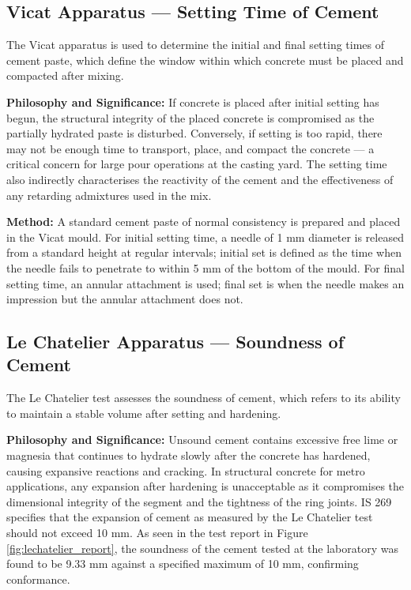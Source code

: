\subsection{Vicat Apparatus --- Setting Time of Cement}
\par\noindent
The Vicat apparatus is used to determine the initial and final setting times of cement paste, which define the window within which concrete must be placed and compacted after mixing.

\par\noindent
\textbf{Philosophy and Significance:} If concrete is placed after initial setting has begun, the structural integrity of the placed concrete is compromised as the partially hydrated paste is disturbed. Conversely, if setting is too rapid, there may not be enough time to transport, place, and compact the concrete --- a critical concern for large pour operations at the casting yard. The setting time also indirectly characterises the reactivity of the cement and the effectiveness of any retarding admixtures used in the mix.

\par\noindent
\textbf{Method:} A standard cement paste of normal consistency is prepared and placed in the Vicat mould. For initial setting time, a needle of 1 mm diameter is released from a standard height at regular intervals; initial set is defined as the time when the needle fails to penetrate to within 5 mm of the bottom of the mould. For final setting time, an annular attachment is used; final set is when the needle makes an impression but the annular attachment does not.

\subsection{Le Chatelier Apparatus --- Soundness of Cement}
\par\noindent
The Le Chatelier test assesses the soundness of cement, which refers to its ability to maintain a stable volume after setting and hardening.

\par\noindent
\textbf{Philosophy and Significance:} Unsound cement contains excessive free lime or magnesia that continues to hydrate slowly after the concrete has hardened, causing expansive reactions and cracking. In structural concrete for metro applications, any expansion after hardening is unacceptable as it compromises the dimensional integrity of the segment and the tightness of the ring joints. IS 269 specifies that the expansion of cement as measured by the Le Chatelier test should not exceed 10 mm. As seen in the test report in Figure \ref{fig:lechatelier_report}, the soundness of the cement tested at the laboratory was found to be 9.33 mm against a specified maximum of 10 mm, confirming conformance.

